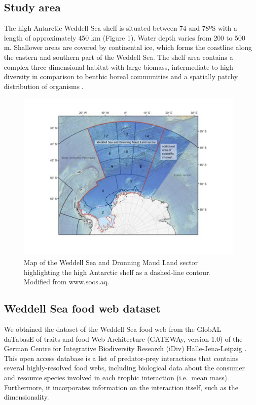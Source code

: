 \documentclass[gc, manuscript]{copernicus}
\begin{document}
\subsection{Study area}

The high Antarctic Weddell Sea shelf is situated between 74 and 78ºS
with a length of approximately 450 km (Figure 1). Water depth varies
from 200 to 500 m. Shallower areas are covered by continental ice, which
forms the coastline along the eastern and southern part of the Weddell
Sea. The shelf area contains a complex three-dimensional habitat with
large biomass, intermediate to high diversity in comparison to benthic
boreal communities and a spatially patchy distribution of organisms
\citep{Dayton1990, Teixido2002}.

\begin{figure}
\includegraphics[width=12cm]{WeddellSea_map} \caption{Map of the Weddell Sea and Dronning Maud Land sector highlighting the high Antarctic shelf as a dashed-line contour. Modified from www.soos.aq.}\label{fig:unnamed-chunk-1}
\end{figure}

\subsection{Weddell Sea food web dataset}

We obtained the dataset of the Weddell Sea food web from the GlobAL
daTabasE of traits and food Web Architecture (GATEWAy, version 1.0) of
the German Centre for Integrative Biodiversity Research (iDiv)
Halle-Jena-Leipzig \citep{Brose2018}. This open access database is a
list of predator-prey interactions that contains several highly-resolved
food webs, including biological data about the consumer and resource
species involved in each trophic interaction (i.e.~mean mass).
Furthermore, it incorporates information on the interaction itself, such
as the dimensionality.
\end{document}
